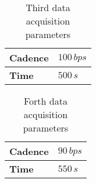 \documentclass[a4paper,twoside,10pt]{report}
\begin{document}
\begin{table}[h]
	\centering
		\begin{tabular}{|l|l|}
		  \hline
			\textbf{Cadence} & $100\,bps$\\
			\hline
			\textbf{Time} & $500\,s$\\
			\hline
		\end{tabular}
	\caption{Third data acquisition parameters}
	\label{tab:ThirdDataAcquisitionParametersAndrea}
\end{table}

\begin{table}[h]
	\centering
		\begin{tabular}{|l|l|}
		  \hline
			\textbf{Cadence} & $90\,bps$\\
			\hline
			\textbf{Time} & $550\,s$\\
			\hline
		\end{tabular}
	\caption{Forth data acquisition parameters}
	\label{tab:ForthDataAcquisitionParametersAndrea}
\end{table}
\end{document}
